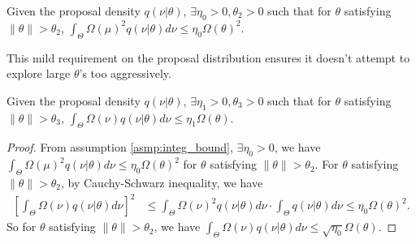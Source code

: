 \begin{assumption}
Given the proposal density $q(\nu | \theta)$, $\exists \eta_0 > 0, \theta_2 > 0$ 
such that for $\theta$ satisfying $\| \theta \|  > \theta_2$, 
$ \int_\Theta \Omega(\mu)^2 q(\nu | \theta)d\nu \leq \eta_0 \Omega(\theta)^2.$
\label{asmp:integ_bound}
\end{assumption}
\noindent This mild requirement on the proposal distribution ensures it 
doesn't attempt
to explore large $\theta$'s too aggressively.
\begin{corollary}
Given the proposal density $q(\nu | \theta)$, $\exists \eta_1 > 0, \theta_3 > 0$ such that for $\theta$ 
satisfying $\| \theta \|  > \theta_3$, 
$ \int_\Theta \Omega(\nu) q(\nu | \theta)d\nu \leq \eta_1 \Omega(\theta).$
\label{corol:integ_bound}
\end{corollary}
\begin{proof}
From assumption \ref{asmp:integ_bound},  $\exists \eta_0 > 0$, we have $ \int_\Theta \Omega(\mu)^2 q(\nu | \theta)d\nu \leq \eta_0 \Omega(\theta)^2$ for $\theta$ satisfying $\| \theta \|  > \theta_2$.
For $\theta$ satisfying $\| \theta \|  > \theta_2$, by Cauchy-Schwarz inequality, we have
\begin{align*}
\left[ \int_\Theta \Omega(\nu) q(\nu | \theta) d\nu \right]^2 &\le \int_\Theta \Omega(\nu)^2 q(\nu | \theta) d\nu \cdot \int_\Theta q(\nu | \theta) d\nu \le \eta_0 \Omega(\theta)^2.
\end{align*}
So for $\theta$ satisfying $\| \theta \|  > \theta_2$, we have $\int_\Theta \Omega(\nu) q(\nu | \theta) d\nu \le \sqrt{\eta_0} \Omega(\theta).$
\end{proof}



